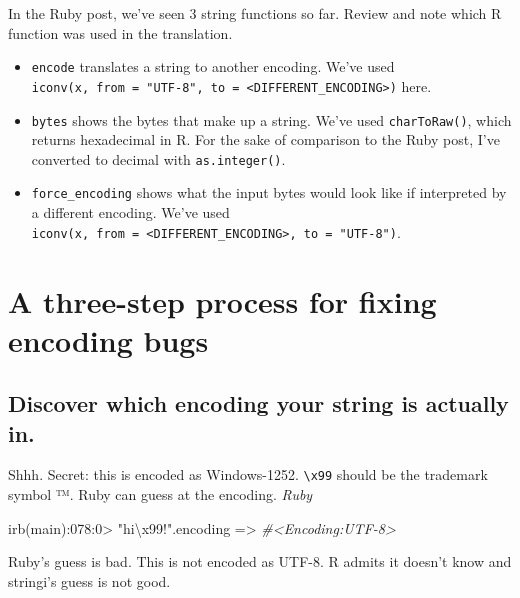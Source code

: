 \documentclass[
]{book}
\newenvironment{Shaded}{\begin{snugshade}}{\end{snugshade}}
\newcommand{\BaseNTok}[1]{\textcolor[rgb]{0.00,0.00,0.81}{#1}}
\newcommand{\CommentTok}[1]{\textcolor[rgb]{0.56,0.35,0.01}{\textit{#1}}}
\newcommand{\DecValTok}[1]{\textcolor[rgb]{0.00,0.00,0.81}{#1}}
\newcommand{\NormalTok}[1]{#1}
\newcommand{\StringTok}[1]{\textcolor[rgb]{0.31,0.60,0.02}{#1}}
\providecommand{\tightlist}{%
  \setlength{\itemsep}{0pt}\setlength{\parskip}{0pt}}
\begin{document}
In the Ruby post, we've seen 3 string functions so far. Review and note which R function was used in the translation.

\begin{itemize}
\tightlist
\item
  \texttt{encode} translates a string to another encoding. We've used \texttt{iconv(x,\ from\ =\ "UTF-8",\ to\ =\ \textless{}DIFFERENT\_ENCODING\textgreater{})} here.
\item
  \texttt{bytes} shows the bytes that make up a string. We've used \texttt{charToRaw()}, which returns hexadecimal in R. For the sake of comparison to the Ruby post, I've converted to decimal with \texttt{as.integer()}.
\item
  \texttt{force\_encoding} shows what the input bytes would look like if interpreted by a different encoding. We've used \texttt{iconv(x,\ from\ =\ \textless{}DIFFERENT\_ENCODING\textgreater{},\ to\ =\ "UTF-8")}.
\end{itemize}

\hypertarget{a-three-step-process-for-fixing-encoding-bugs}{%
\section{A three-step process for fixing encoding bugs}\label{a-three-step-process-for-fixing-encoding-bugs}}

\hypertarget{discover-which-encoding-your-string-is-actually-in.}{%
\subsection{Discover which encoding your string is actually in.}\label{discover-which-encoding-your-string-is-actually-in.}}

Shhh. Secret: this is encoded as Windows-1252. \texttt{\textbackslash{}x99} should be the trademark symbol ™. Ruby can guess at the encoding. \emph{Ruby}

\begin{Shaded}
\begin{Highlighting}[]
\NormalTok{irb(main):}\BaseNTok{07}\NormalTok{8:}\DecValTok{0}\NormalTok{> }\StringTok{"hi\textbackslash{}x99!"}\NormalTok{.encoding}
\NormalTok{=> }\CommentTok{#<Encoding:UTF-8>}
\end{Highlighting}
\end{Shaded}

Ruby's guess is bad. This is not encoded as UTF-8. R admits it doesn't know and stringi's guess is not good.
\end{document}
